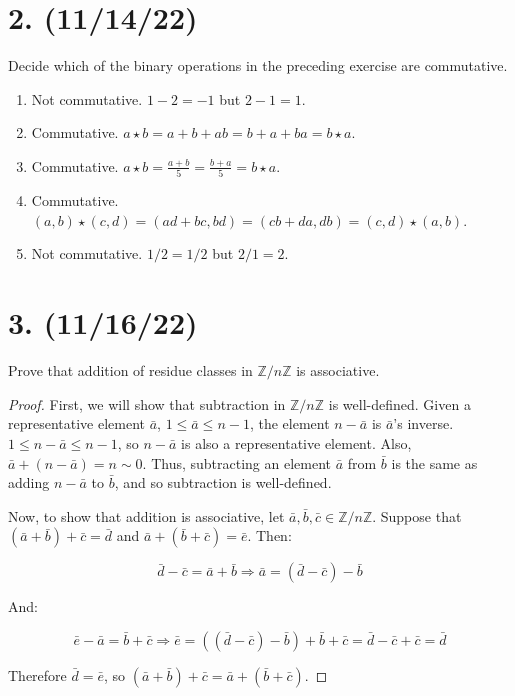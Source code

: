 \documentclass{article}
\begin{document}
\section*{2. (11/14/22)}

Decide which of the binary operations in the preceding exercise are commutative.

\begin{enumerate}[label=\alph*)]
    \item Not commutative. $1 - 2 = -1$ but $2 - 1 = 1$.
    \item Commutative. $a \star b = a + b + ab = b + a + ba = b \star a$.
    \item Commutative. $a \star b = \frac{a + b}{5} = \frac{b + a}{5} = b \star a$.
    \item Commutative. $(a,b)\star(c,d) = (ad + bc, bd) = (cb + da, db) = (c,d)\star(a,b)$.
    \item Not commutative. $1 / 2 = 1/2$ but $2 / 1 = 2$.
\end{enumerate}

\section*{3. (11/16/22)}

Prove that addition of residue classes in $\mathbb{Z}/n\mathbb{Z}$ is associative.

\begin{proof}

      First, we will show that subtraction in $\mathbb{Z}/n\mathbb{Z}$ is well-defined. Given a representative element $\bar{a}$, $1 \leq \bar{a} \leq n - 1$, the element $n - \bar{a}$ is $\bar{a}$'s inverse. $1 \leq n - \bar{a} \leq n - 1$, so $n - \bar{a}$ is also a representative element. Also, $\bar{a} + (n - \bar{a}) = n \sim 0$. Thus, subtracting an element $\bar{a}$ from $\bar{b}$ is the same as adding $n - \bar{a}$ to $\bar{b}$, and so subtraction is well-defined.

      Now, to show that addition is associative, let $\bar{a}, \bar{b}, \bar{c} \in \mathbb{Z}/n\mathbb{Z}$. Suppose that $(\bar{a} + \bar{b}) + \bar{c} = \bar{d}$ and $\bar{a} + (\bar{b} + \bar{c}) = \bar{e}$. Then:

      \begin{equation*}
            \bar{d} - \bar{c} = \bar{a} + \bar{b} \Rightarrow \bar{a} = (\bar{d} - \bar{c}) - \bar{b}
      \end{equation*}

      And:

      \begin{equation*}
            \bar{e} - \bar{a} = \bar{b} + \bar{c} \Rightarrow \bar{e} = ((\bar{d} - \bar{c}) - \bar{b}) + \bar{b} + \bar{c} = \bar{d} - \bar{c} + \bar{c} = \bar{d} 
      \end{equation*}

      Therefore $\bar{d} = \bar{e}$, so $(\bar{a} + \bar{b}) + \bar{c} = \bar{a} + (\bar{b} + \bar{c})$.
\end{proof}
\end{document}
